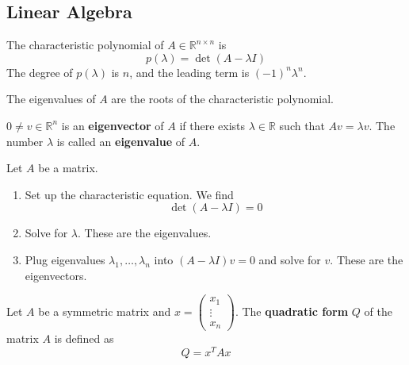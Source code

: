 \subsection{Linear Algebra}
\begin{definition}
  The characteristic polynomial of $A \in \mathbb R^{n \times n}$ is 
  $$p(\lambda) = \det(A - \lambda I)$$ The degree of $p(\lambda)$ is $n$, and the leading term is $(-1)^n \lambda^n$.

  The eigenvalues of $A$ are the roots of the characteristic polynomial.
\end{definition}
\begin{definition}
  $0 \neq v \in \mathbb R^n$ is an \textbf{eigenvector} of $A$ if there exists $\lambda \in \mathbb R$ such that $Av = \lambda v$. The number $\lambda$ is called an \textbf{eigenvalue} of $A$.
\end{definition}
\begin{theorem}
  Let $A$ be a matrix.
  \begin{enumerate}
    \item Set up the characteristic equation. We find $$\det(A - \lambda I) = 0$$
    \item Solve for $\lambda$. These are the eigenvalues.
    \item Plug eigenvalues $\lambda_1,\ldots, \lambda_n$ into $(A - \lambda I)v = 0$ and solve for $v$. These are the eigenvectors.
  \end{enumerate}
\end{theorem}
\begin{definition}
  Let $A$ be a symmetric matrix and $x = \begin{pmatrix}
      x_1 \\ \vdots \\ x_n
  \end{pmatrix}$. The \textbf{quadratic form} $Q$ of the matrix $A$ is defined as $$Q = x^T Ax$$
\end{definition}

